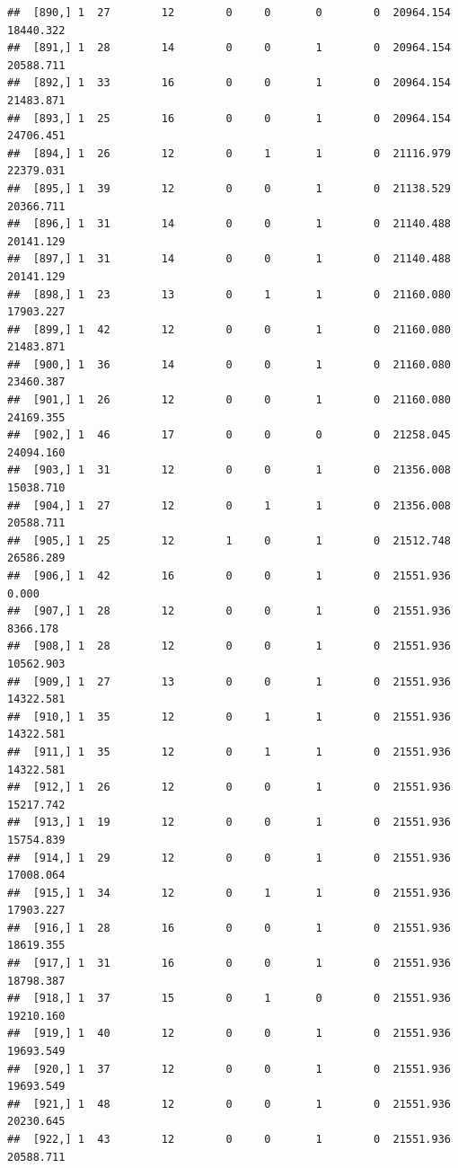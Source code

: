 \documentclass[
]{article}
\begin{document}
\begin{verbatim}
##  [890,] 1  27        12        0     0       0        0  20964.154  18440.322
##  [891,] 1  28        14        0     0       1        0  20964.154  20588.711
##  [892,] 1  33        16        0     0       1        0  20964.154  21483.871
##  [893,] 1  25        16        0     0       1        0  20964.154  24706.451
##  [894,] 1  26        12        0     1       1        0  21116.979  22379.031
##  [895,] 1  39        12        0     0       1        0  21138.529  20366.711
##  [896,] 1  31        14        0     0       1        0  21140.488  20141.129
##  [897,] 1  31        14        0     0       1        0  21140.488  20141.129
##  [898,] 1  23        13        0     1       1        0  21160.080  17903.227
##  [899,] 1  42        12        0     0       1        0  21160.080  21483.871
##  [900,] 1  36        14        0     0       1        0  21160.080  23460.387
##  [901,] 1  26        12        0     0       1        0  21160.080  24169.355
##  [902,] 1  46        17        0     0       0        0  21258.045  24094.160
##  [903,] 1  31        12        0     0       1        0  21356.008  15038.710
##  [904,] 1  27        12        0     1       1        0  21356.008  20588.711
##  [905,] 1  25        12        1     0       1        0  21512.748  26586.289
##  [906,] 1  42        16        0     0       1        0  21551.936      0.000
##  [907,] 1  28        12        0     0       1        0  21551.936   8366.178
##  [908,] 1  28        12        0     0       1        0  21551.936  10562.903
##  [909,] 1  27        13        0     0       1        0  21551.936  14322.581
##  [910,] 1  35        12        0     1       1        0  21551.936  14322.581
##  [911,] 1  35        12        0     1       1        0  21551.936  14322.581
##  [912,] 1  26        12        0     0       1        0  21551.936  15217.742
##  [913,] 1  19        12        0     0       1        0  21551.936  15754.839
##  [914,] 1  29        12        0     0       1        0  21551.936  17008.064
##  [915,] 1  34        12        0     1       1        0  21551.936  17903.227
##  [916,] 1  28        16        0     0       1        0  21551.936  18619.355
##  [917,] 1  31        16        0     0       1        0  21551.936  18798.387
##  [918,] 1  37        15        0     1       0        0  21551.936  19210.160
##  [919,] 1  40        12        0     0       1        0  21551.936  19693.549
##  [920,] 1  37        12        0     0       1        0  21551.936  19693.549
##  [921,] 1  48        12        0     0       1        0  21551.936  20230.645
##  [922,] 1  43        12        0     0       1        0  21551.936  20588.711

\end{verbatim}
\end{document}
